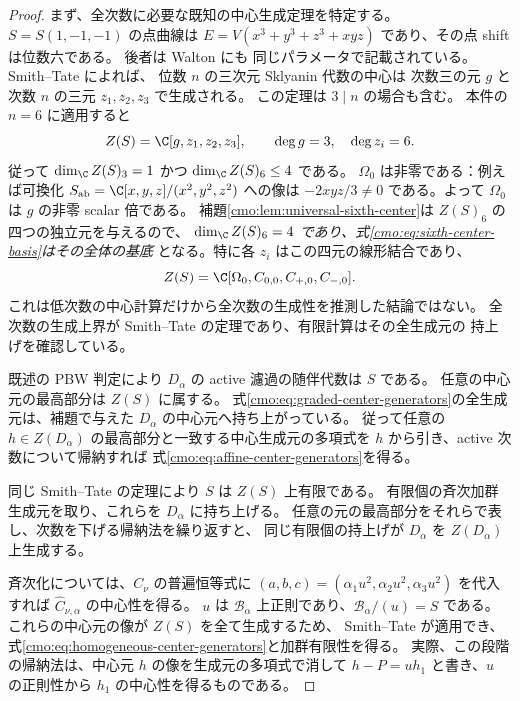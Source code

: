 \begin{proof}
まず、全次数に必要な既知の中心生成定理を特定する。
$S=S(1,-1,-1)$ の点曲線は
$E=V(x^3+y^3+z^3+xyz)$ であり、その点 shift は位数六である。
後者は Walton \cite[Proposition~4.1]{CMOWaltonRepresentations} にも
同じパラメータで記載されている。
Smith--Tate \cite[Theorem~3.7, $r=1$]{GRSklyaninST} によれば、
位数 $n$ の三次元 Sklyanin 代数の中心は
次数三の元 $g$ と次数 $n$ の三元 $z_1,z_2,z_3$ で生成される。
この定理は $3\mid n$ の場合も含む。
本件の $n=6$ に適用すると
\[
 Z(S)=\C[g,z_1,z_2,z_3],\qquad
 \deg g=3,\quad\deg z_i=6.
\]
従って $\dim_\C Z(S)_3=1$ かつ $\dim_\C Z(S)_6\le4$ である。
$\Omega_0$ は非零である：例えば可換化
$S_{\mathrm{ab}}=\C[x,y,z]/(x^2,y^2,z^2)$ への像は
$-2xyz/3\ne0$ である。よって $\Omega_0$ は $g$ の非零 scalar 倍である。
補題\ref{cmo:lem:universal-sixth-center}は $Z(S)_6$ の四つの独立元を与えるので、
\emph{$\dim_\C Z(S)_6=4$ であり、式\eqref{cmo:eq:sixth-center-basis}はその全体の基底}
となる。特に各 $z_i$ はこの四元の線形結合であり、
\begin{equation}\label{cmo:eq:graded-center-generators}
 Z(S)=\C[\Omega_0,C_{0,0},C_{+,0},C_{-,0}].
\end{equation}
これは低次数の中心計算だけから全次数の生成性を推測した結論ではない。
全次数の生成上界が Smith--Tate の定理であり、有限計算はその全生成元の
持上げを確認している。

既述の PBW 判定により $D_\alpha$ の active 濾過の随伴代数は $S$ である。
任意の中心元の最高部分は $Z(S)$ に属する。
式\eqref{cmo:eq:graded-center-generators}の全生成元は、補題で与えた
$D_\alpha$ の中心元へ持ち上がっている。
従って任意の $h\in Z(D_\alpha)$ の最高部分と一致する中心生成元の多項式を
$h$ から引き、active 次数について帰納すれば
式\eqref{cmo:eq:affine-center-generators}を得る。

同じ Smith--Tate の定理により $S$ は $Z(S)$ 上有限である。
有限個の斉次加群生成元を取り、これらを $D_\alpha$ に持ち上げる。
任意の元の最高部分をそれらで表し、次数を下げる帰納法を繰り返すと、
同じ有限個の持上げが $D_\alpha$ を $Z(D_\alpha)$ 上生成する。

斉次化については、$C_\nu$ の普遍恒等式に
$(a,b,c)=(\alpha_1u^2,\alpha_2u^2,\alpha_3u^2)$ を代入すれば
$\widehat C_{\nu,\alpha}$ の中心性を得る。
$u$ は $\mathcal B_\alpha$ 上正則であり、$\mathcal B_\alpha/(u)=S$ である。
これらの中心元の像が $Z(S)$ を全て生成するため、
Smith--Tate \cite[Lemma~3.6]{GRSklyaninST} が適用でき、
式\eqref{cmo:eq:homogeneous-center-generators}と加群有限性を得る。
実際、この段階の帰納法は、中心元 $h$ の像を生成元の多項式で消して
$h-P=u h_1$ と書き、$u$ の正則性から $h_1$ の中心性を得るものである。
\end{proof}

